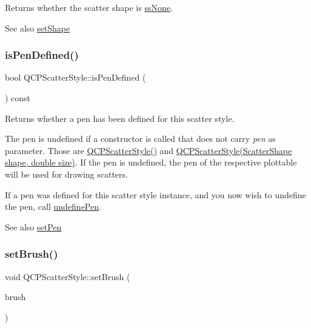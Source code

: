 Returns whether the scatter shape is \hyperlink{classQCPScatterStyle_adb31525af6b680e6f1b7472e43859349abd144c291ca274f77053ec68cab6c022}{ss\+None}.

\begin{DoxySeeAlso}{See also}
\hyperlink{classQCPScatterStyle_a7c641c4d4c6d29cb705d3887cfce91c1}{set\+Shape} 
\end{DoxySeeAlso}
\mbox{\label{classQCPScatterStyle_a47077eb6450fe9a788f833e4ec1b1d5a}} 
\subsubsection{\texorpdfstring{is\+Pen\+Defined()}{isPenDefined()}}
{\footnotesize\ttfamily bool Q\+C\+P\+Scatter\+Style\+::is\+Pen\+Defined (\begin{DoxyParamCaption}{ }\end{DoxyParamCaption}) const\hspace{0.3cm}{\ttfamily [inline]}}

Returns whether a pen has been defined for this scatter style.

The pen is undefined if a constructor is called that does not carry {\itshape pen} as parameter. Those are \hyperlink{classQCPScatterStyle_a8836018d9ad83ccd8870de8315c1be73}{Q\+C\+P\+Scatter\+Style()} and \hyperlink{classQCPScatterStyle_a003d92f74f4561eda111862eadd62f28}{Q\+C\+P\+Scatter\+Style(\+Scatter\+Shape shape, double size)}. If the pen is undefined, the pen of the respective plottable will be used for drawing scatters.

If a pen was defined for this scatter style instance, and you now wish to undefine the pen, call \hyperlink{classQCPScatterStyle_acabc2a8c83d650b946f50c3166b6c35e}{undefine\+Pen}.

\begin{DoxySeeAlso}{See also}
\hyperlink{classQCPScatterStyle_a761f1f229cc0ca4703e1e2b89f6dd1ba}{set\+Pen} 
\end{DoxySeeAlso}
\mbox{\label{classQCPScatterStyle_a74d692aaeb8d4b36d6f7d510e44264b1}} 
\subsubsection{\texorpdfstring{set\+Brush()}{setBrush()}}
{\footnotesize\ttfamily void Q\+C\+P\+Scatter\+Style\+::set\+Brush (\begin{DoxyParamCaption}\item[{const Q\+Brush \&}]{brush }\end{DoxyParamCaption})}


